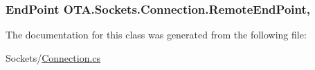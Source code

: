 \subsubsection[{Remote\+End\+Point}]{\setlength{\rightskip}{0pt plus 5cm}End\+Point O\+T\+A.\+Sockets.\+Connection.\+Remote\+End\+Point\hspace{0.3cm}{\ttfamily [get]}, {}}\label{class_o_t_a_1_1_sockets_1_1_connection_a20d5faf4c61da54dbfa6ccf481793e3b}


The documentation for this class was generated from the following file\+:\begin{DoxyCompactItemize}
\item 
Sockets/\hyperlink{_connection_8cs}{Connection.\+cs}\end{DoxyCompactItemize}
